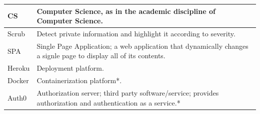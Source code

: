 \documentclass[11pt]{article}
\begin{document}
\begin{tabular}{ |p{2cm}|p{14.7cm}| }
	\hline
	CS                   & Computer Science, as in the academic discipline of Computer Science.                                                                                                                                                                                                                                                                                                                                                     \\
	\hline
	Scrub                & Detect private information and highlight it according to severity.                                                                                                                                                                                                                                                                                                                                                       \\
	\hline
	SPA                  & Single Page Application; a web application that dynamically changes a signle page to display all of its contents.                                                                                                                                                                                                                                                                                                        \\
	\hline
	Heroku               & Deployment platform.                                                                                                                                                                                                                                                                                                                                                                                                     \\
	\hline
	Docker               & Containerization platform*.                                                                                                                                                                                                                                                                                                                                                                                              \\
	\hline
	Auth0		    &Authorization server; third party software/service; provides authorization and authentication as a service.*
\\
	\hline
\end{tabular}
\end{document}
